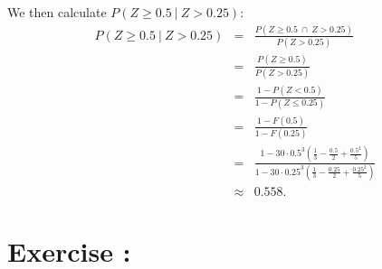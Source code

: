 \documentclass[12pt,thmsa]{article}
\begin{document}
\begin{enumerate}
We then calculate $P ( Z \ge 0.5 \ | \ Z > 0.25)$:
   \begin{eqnarray*}
     P ( Z \ge 0.5 \ | \ Z > 0.25) &=& \frac{P(Z \ge 0.5 \ \cap \ Z >
       0.25)}{P(Z > 0.25)} \\
     &=& \frac{P(Z \ge 0.5)}{P(Z > 0.25)} \\
     &=& \frac{1-P(Z<0.5)}{1-P(Z\le 0.25)} \\
     &=& \frac{1-F(0.5)}{1-F(0.25)} \\
     &=& \frac{1-30 \cdot 0.5^3 \left(\frac{1}{3}-\frac{0.5}{2} +
         \frac{0.5^2}{5}\right)}{1-30 \cdot 0.25^3 \left( \frac{1}{3} -
         \frac{0.25}{2} + \frac{0.25^2}{5}\right)} \\
     &\approx& {0.558}.
   \end{eqnarray*}
\end{enumerate}

\addtocounter{section}{1}
\section*{Exercise \thesection:}
\end{document}
